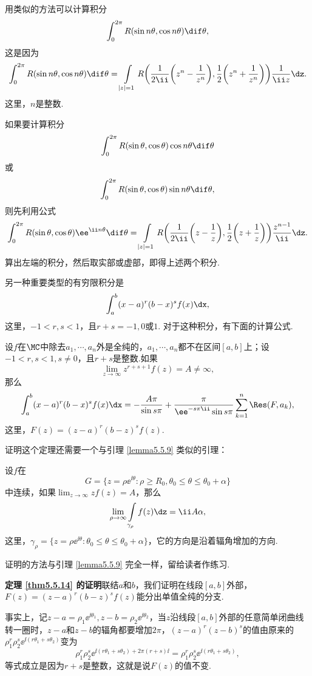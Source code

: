 用类似的方法可以计算积分
\[\int_0^{2\pi}R(\sin n\theta,\cos n\theta)\dif \theta,\]
这是因为
\[\int_0^{2\pi}R(\sin n\theta,\cos n\theta)\dif \theta=
\int\limits_{|z|=1}R\bigg(\frac1{2\ii}\bigg(z^n-\frac1{z^n}\bigg),
\frac12\bigg(z^n+\frac1{z^n}\bigg)\bigg)\frac1{\ii z}\dz.\]
这里，$n$是整数.

如果要计算积分
\[\int_0^{2\pi}R(\sin \theta,\cos \theta)\cos n\theta\dif \theta\]
或
\[\int_0^{2\pi}R(\sin \theta,\cos \theta)\sin n\theta\dif \theta,\]
则先利用公式
\begin{equation}\label{eq5.5.10}
\int_0^{2\pi}R(\sin\theta,\cos\theta)\ee^{\ii n\theta}\dif \theta=
\int\limits_{|z|=1}R\bigg(\frac1{2\ii}\bigg(z-\frac1z\bigg),
\frac12\bigg(z+\frac1z\bigg)\bigg)\frac{z^{n-1}}{\ii}\dz.
\end{equation}
算出左端的积分，然后取实部或虚部，即得上述两个积分.

另一种重要类型的有穷限积分是
\[\int_a^b(x-a)^r(b-x)^sf(x)\dx,\]
这里，$-1<r,s<1$，且$r+s=-1,0$或$1$. 对于这种积分，有下面的计算公式.

\begin{theorem}\label{thm5.5.14}
设$f$在$\MC$中除去$a_1,\cdots,a_n$外是全纯的，$a_1,\cdots,a_n$都不在区间$[a,b]$上；设$-1<r,s<1,s\ne0$，且$r+s$是整数.如果
\[\lim_{z\to\infty}z^{r+s+1}f(z)=A\ne\infty,\]
那么
\begin{equation}\label{eq5.5.11}
\int_a^b(x-a)^r(b-x)^sf(x)\dx=-\frac{A\pi}{\sin s\pi}+\frac\pi{\ee^{-s\pi\ii}\sin
s\pi}\sum_{k=1}^n\Res(F,a_k),
\end{equation}
这里，$F(z)=(z-a)^r(b-z)^sf(z)$.
\end{theorem}

证明这个定理还需要一个与引理 \ref{lemma5.5.9} 类似的引理：
\begin{lemma}\label{lemma5.5.15}
设$f$在
\[G=\{z=\rho\ee^{\ii\theta}:\rho\ge R_0,\theta_0\le\theta\le\theta_0+\alpha\}\]
中连续，如果$\lim_{z\to\infty}zf(z)=A$，那么
\[\lim_{\rho\to\infty}\int\limits_{\gamma_\rho}f(z)\dz=\ii A\alpha,\]
这里，$\gamma_\rho=\{z=\rho\ee^{\ii\theta}:\theta_0\le\theta\le\theta_0+\alpha\}$，它的方向是沿着辐角增加的方向.

证明的方法与引理 \ref{lemma5.5.9} 完全一样，留给读者作练习.
\end{lemma}

\textbf{定理 \ref{thm5.5.14} 的证明}\quad 联结$a$和$b$，我们证明在线段$[a,b]$外部，$F(z)=(z-a)^r(b-z)^sf(z)$能分出单值全纯的分支.

事实上，记$z-a=\rho_1\ee^{\ii\theta_1},z-b=\rho_2\ee^{\ii\theta_2}$，当$z$沿线段$[a,b]$外部的任意简单闭曲线转一圈时，$z-a$和$z-b$的辐角都要增加$2\pi$，$(z-a)^r(z-b)^s$的值由原来的$\rho_1^r\rho_2^s\ee^{\ii(r\theta_1+s\theta_2)}$变为
\[\rho_1^r\rho_2^s\ee^{\ii(r\theta_1+s\theta_2)+2\pi(r+s)\ii}=
\rho_1^r\rho_2^s\ee^{\ii(r\theta_1+s\theta_2)},\]
等式成立是因为$r+s$是整数，这就是说$F(z)$的值不变.


